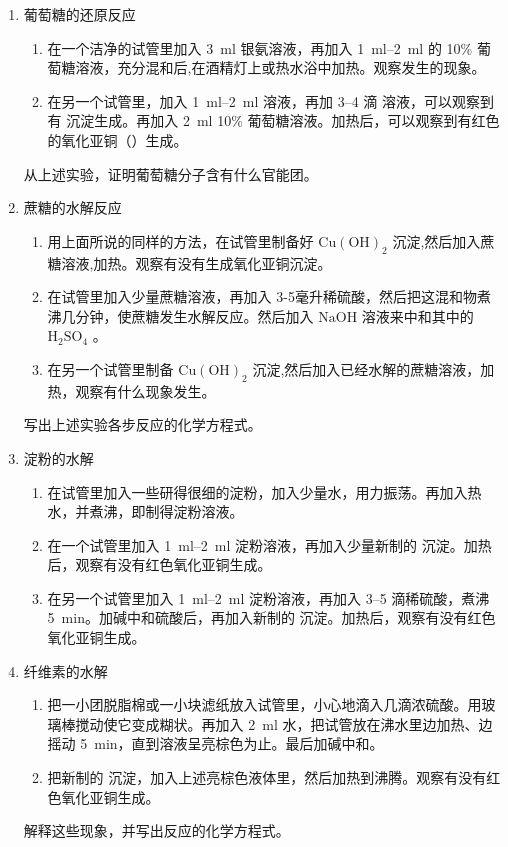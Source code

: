 \begin{enumerate}[1.]
  \item 葡萄糖的还原反应
  \begin{enumerate}[(1)]
    \item 在一个洁净的试管里加入 \qty{3}{ml} 银氨溶液，再加入 \qtyrange{1}{2}{ml} 的 10\% 葡萄糖溶液，充分混和后,在酒精灯上或热水浴中加热。观察发生的现象。
    \item 在另一个试管里，加入 \qtyrange{1}{2}{ml}  溶液，再加 \numrange{3}{4} 滴  溶液，可以观察到有  沉淀生成。再加入 \qty{2}{ml} 10\% 葡萄糖溶液。加热后，可以观察到有红色的氧化亚铜（）生成。
  \end{enumerate}

  从上述实验，证明葡萄糖分子含有什么官能团。
  \item 蔗糖的水解反应
  \begin{enumerate}[(1)]
    \item 用上面所说的同样的方法，在试管里制备好 \(\mathrm{{Cu}}{\left( \mathrm{{OH}}\right) }_{2}\) 沉淀,然后加入蔗糖溶液,加热。观察有没有生成氧化亚铜沉淀。
    \item 在试管里加入少量蔗糖溶液，再加入 3-5毫升稀硫酸，然后把这混和物煮沸几分钟，使蔗糖发生水解反应。然后加入 \(\mathrm{{NaOH}}\) 溶液来中和其中的 \({\mathrm{H}}_{2}{\mathrm{{SO}}}_{4}\) 。
    \item 在另一个试管里制备 \(\mathrm{{Cu}}{\left( \mathrm{{OH}}\right) }_{2}\) 沉淀,然后加入已经水解的蔗糖溶液，加热，观察有什么现象发生。
  \end{enumerate}

  写出上述实验各步反应的化学方程式。
  \item 淀粉的水解
  \begin{enumerate}[(1)]
    \item 在试管里加入一些研得很细的淀粉，加入少量水，用力振荡。再加入热水，并煮沸，即制得淀粉溶液。
    \item 在一个试管里加入 \qtyrange{1}{2}{ml} 淀粉溶液，再加入少量新制的  沉淀。加热后，观察有没有红色氧化亚铜生成。
    \item 在另一个试管里加入 \qtyrange{1}{2}{ml} 淀粉溶液，再加入 \numrange{3}{5} 滴稀硫酸，煮沸 \qty{5}{min}。加碱中和硫酸后，再加入新制的  沉淀。加热后，观察有没有红色氧化亚铜生成。
  \end{enumerate}
  \item 纤维素的水解
  \begin{enumerate}[(1)]
    \item 把一小团脱脂棉或一小块滤纸放入试管里，小心地滴入几滴浓硫酸。用玻璃棒搅动使它变成糊状。再加入 \qty{2}{ml} 水，把试管放在沸水里边加热、边摇动 \qty{5}{min}，直到溶液呈亮棕色为止。最后加碱中和。
    \item 把新制的  沉淀，加入上述亮棕色液体里，然后加热到沸腾。观察有没有红色氧化亚铜生成。
  \end{enumerate}

  解释这些现象，并写出反应的化学方程式。
\end{enumerate}

